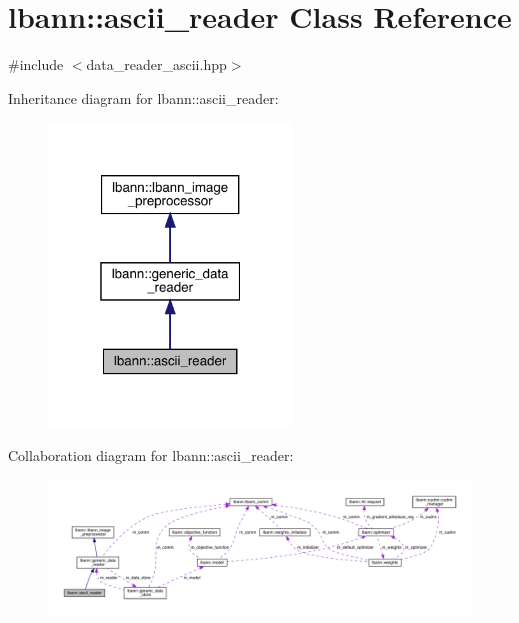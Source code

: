 \hypertarget{classlbann_1_1ascii__reader}{}\section{lbann\+:\+:ascii\+\_\+reader Class Reference}
\label{classlbann_1_1ascii__reader}


{\ttfamily \#include $<$data\+\_\+reader\+\_\+ascii.\+hpp$>$}



Inheritance diagram for lbann\+:\+:ascii\+\_\+reader\+:\nopagebreak
\begin{figure}[H]
\begin{center}
\leavevmode
\includegraphics[width=184pt]{classlbann_1_1ascii__reader__inherit__graph}
\end{center}
\end{figure}


Collaboration diagram for lbann\+:\+:ascii\+\_\+reader\+:\nopagebreak
\begin{figure}[H]
\begin{center}
\leavevmode
\includegraphics[width=350pt]{classlbann_1_1ascii__reader__coll__graph}
\end{center}
\end{figure}
